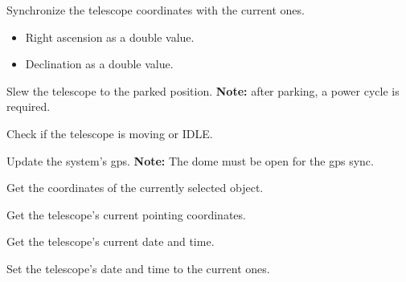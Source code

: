 \documentclass[a4paper,english]{article}
\begin{document}
\begin{Description}
\item[\Arg{sync}] Synchronize the telescope coordinates with the current ones.

	   

	     

	\begin{itemize}
		\item {} Right ascension as a double value.
		\item {} Declination as a double value.
	\end{itemize}

\item[\Arg{park}] Slew the telescope to the parked position. \textbf{Note:} after parking, a power cycle is required.

	   

\item[\Arg{status}] Check if the telescope is moving or IDLE.

	   
	
\item[\Arg{gps}] Update the system's gps. \textbf{Note:} The dome must be open for the gps sync.

	   
	
\item[\Arg{getobjradec}] Get the coordinates of the currently selected object.

	   
	
\item[\Arg{gettelradec}] Get the telescope's current pointing coordinates.

	   
	
\item[\Arg{getdatetime}] Get the telescope's current date and time.

	   
	
\item[\Arg{setdatetime}] Set the telescope's date and time to the current ones.

	   
	

\end{Description}
\end{document}
